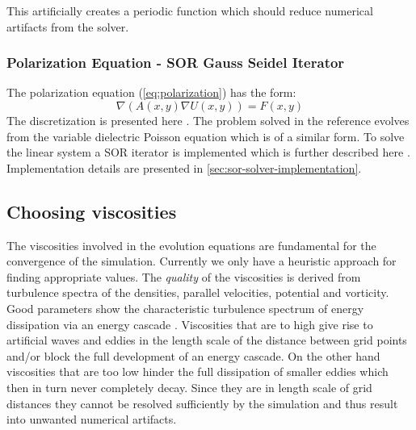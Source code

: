 \documentclass[master.tex]{subfiles}
\begin{document}
This artificially creates a periodic function which should reduce numerical artifacts from the solver.

\subsubsection{Polarization Equation - \ac{SOR} Gauss Seidel Iterator} \label{sec:polarization-equation}
The polarization equation (\autoref{eq:polarization}) has the form:
\begin{equation}
    \nabla\left( A(x, y) \nabla U(x, y)\right) = F(x, y)
\end{equation}
The discretization is presented here \cite{DielectricPoisson}. The problem solved in the reference evolves from the variable dielectric Poisson equation which is of a similar form. To solve the linear system a \ac{SOR} iterator is implemented which is further described here \cite{SORPaper}. Implementation details are presented in \autoref{sec:sor-solver-implementation}.

\subsection{Choosing viscosities}
The viscosities involved in the evolution equations are fundamental for the convergence of the simulation. Currently we only have a heuristic approach for finding appropriate values.\newline
The \textit{quality} of the viscosities is derived from turbulence spectra of the densities, parallel velocities, potential and vorticity. Good parameters show the characteristic turbulence spectrum of energy dissipation via an energy cascade \cite{TurbulentSpectra}.\newline
Viscosities that are to high give rise to artificial waves and eddies in the length scale of the distance between grid points and/or block the full development of an energy cascade. On the other hand viscosities that are too low hinder the full dissipation of smaller eddies which then in turn never completely decay. Since they are in length scale of grid distances they cannot be resolved sufficiently by the simulation and thus result into unwanted numerical artifacts.
\end{document}
